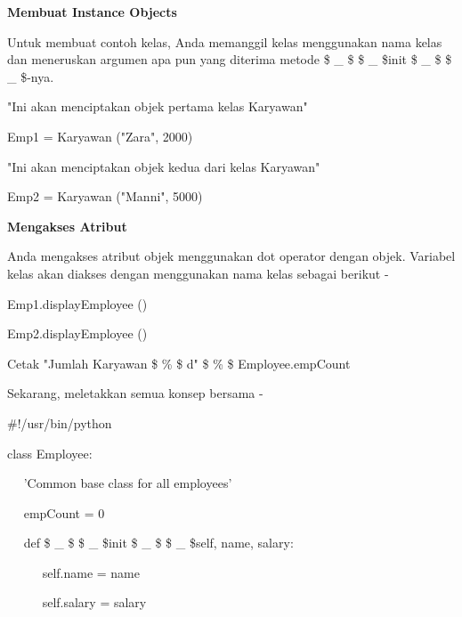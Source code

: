 \vspace{12pt}
\noindent 
{\fontsize{14pt}{14pt}\selectfont \textbf{Membuat Instance Objects} \\} \par
\vspace{12pt}
Untuk membuat contoh kelas, Anda memanggil kelas menggunakan nama kelas dan meneruskan argumen apa pun yang diterima metode  \$  \_  \$ \$  \_  \$init \$  \_  \$ \$  \_  \$-nya. \par
\vspace{12pt}
\noindent 
"Ini akan menciptakan objek pertama kelas Karyawan" \par
\noindent 
Emp1 = Karyawan ("Zara", 2000) \par
\noindent 
"Ini akan menciptakan objek kedua dari kelas Karyawan" \par
\noindent 
Emp2 = Karyawan ("Manni", 5000) \par
\vspace{12pt}
\noindent 
{\fontsize{14pt}{14pt}\selectfont \textbf{Mengakses Atribut} \\} \par
\vspace{12pt}
Anda mengakses atribut objek menggunakan dot operator dengan objek. Variabel kelas akan diakses dengan menggunakan nama kelas sebagai berikut - \par
\vspace{12pt}
\noindent 
Emp1.displayEmployee () \par
\noindent 
Emp2.displayEmployee () \par
\noindent 
Cetak "Jumlah Karyawan \$  \%  \$ d" \$  \%  \$ Employee.empCount \par
\vspace{12pt}
\noindent 
Sekarang, meletakkan semua konsep bersama - \par
\noindent 
 $  \#  $!/usr/bin/python \par
\vspace{12pt}
\noindent 
class Employee: \par
\noindent 
~~ 'Common base class for all employees' \par
\noindent 
~~ empCount = 0 \par
\vspace{12pt}
\noindent 
~~ def  \$  \_  \$ \$  \_  \$init \$  \_  \$ \$  \_  \${self, name, salary}: \par
\noindent 
~~~~~ self.name = name \par
\noindent 
~~~~~ self.salary = salary \par
